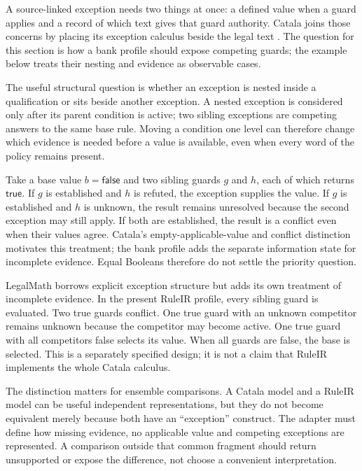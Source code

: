 \label{sec:languages-catala}
A source-linked exception needs two things at once: a defined value when a
guard applies and a record of which text gives that guard authority. Catala
joins those concerns by placing its exception calculus beside the legal text
\citep[secs.~2--4]{catala2021}. The question for this section is how a bank
profile should expose competing guards; the example below treats their nesting
and evidence as observable cases.

The useful structural question is whether an exception is nested inside a
qualification or sits beside another exception. A nested exception is considered
only after its parent condition is active; two sibling exceptions are competing
answers to the same base rule. Moving a condition one level can therefore change
which evidence is needed before a value is available, even when every word of the
policy remains present.

Take a base value $b=\mathsf{false}$ and two sibling guards $g$ and $h$, each of
which returns $\mathsf{true}$. If $g$ is established and $h$ is refuted, the
exception supplies the value. If $g$ is established and $h$ is unknown, the
result remains unresolved because the second exception may still apply. If both
are established, the result is a conflict even when their values agree. Catala's
empty-applicable-value and conflict distinction motivates this treatment; the
bank profile adds the separate information state for incomplete evidence. Equal
Booleans therefore do not settle the priority question.


LegalMath borrows explicit exception structure but adds its own treatment of
incomplete evidence. In the present RuleIR profile, every sibling guard is
evaluated. Two true guards conflict. One true guard with an unknown competitor
remains unknown because the competitor may become active. One true guard with
all competitors false selects its value. When all guards are false, the base
is selected. This is a separately specified design; it is not a claim that
RuleIR implements the whole Catala calculus.

The distinction matters for ensemble comparisons. A Catala model and a RuleIR
model can be useful independent representations, but they do not become
equivalent merely because both have an ``exception'' construct. The adapter
must define how missing evidence, no applicable value and competing exceptions
are represented. A comparison outside that common fragment should return
unsupported or expose the difference, not choose a convenient interpretation.


